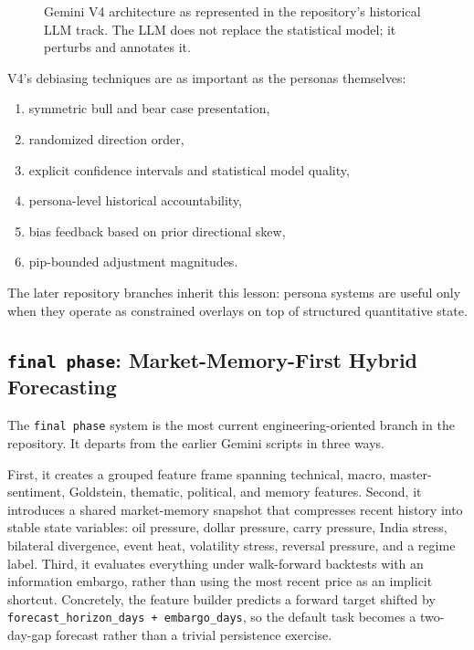 \documentclass[11pt,a4paper]{article}
\begin{document}
\begin{figure}[t]
{}
\caption{Gemini V4 architecture as represented in the repository's historical LLM track. The LLM does not replace the statistical model; it perturbs and annotates it.}
\label{fig:gemini_arch}
\end{figure}

V4's debiasing techniques are as important as the personas themselves:
\begin{enumerate}[leftmargin=*]
    \item symmetric bull and bear case presentation,
    \item randomized direction order,
    \item explicit confidence intervals and statistical model quality,
    \item persona-level historical accountability,
    \item bias feedback based on prior directional skew,
    \item pip-bounded adjustment magnitudes.
\end{enumerate}

The later repository branches inherit this lesson: persona systems are useful only when they operate as constrained overlays on top of structured quantitative state.

\subsection{\texttt{final phase}: Market-Memory-First Hybrid Forecasting}

The \texttt{final phase} system is the most current engineering-oriented branch in the repository. It departs from the earlier Gemini scripts in three ways.

First, it creates a grouped feature frame spanning technical, macro, master-sentiment, Goldstein, thematic, political, and memory features. Second, it introduces a shared market-memory snapshot that compresses recent history into stable state variables: oil pressure, dollar pressure, carry pressure, India stress, bilateral divergence, event heat, volatility stress, reversal pressure, and a regime label. Third, it evaluates everything under walk-forward backtests with an information embargo, rather than using the most recent price as an implicit shortcut. Concretely, the feature builder predicts a forward target shifted by \texttt{forecast\_horizon\_days + embargo\_days}, so the default task becomes a two-day-gap forecast rather than a trivial persistence exercise.
\end{document}
